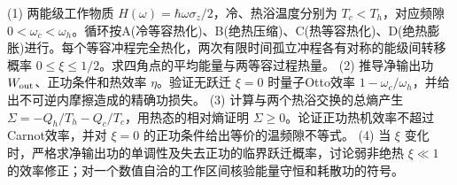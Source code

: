 (1) 两能级工作物质 \(H(\omega)=\hbar\omega\sigma_z/2\)，冷、热浴温度分别为 \(T_c<T_h\)，对应频隙 \(0<\omega_c<\omega_h\)。循环按A(冷等容热化)、B(绝热压缩)、C(热等容热化)、D(绝热膨胀)进行。每个等容冲程完全热化，两次有限时间孤立冲程各有对称的能级间转移概率 \(0\le\xi\le1/2\)。求四角点的平均能量与两等容过程热量。
(2) 推导净输出功 \(W_{\rm out}\)、正功条件和热效率 \(\eta\)。验证无跃迁 \(\xi=0\) 时量子Otto效率 \(1-\omega_c/\omega_h\)，并给出不可逆内摩擦造成的精确功损失。
(3) 计算与两个热浴交换的总熵产生 \(\Sigma=-Q_h/T_h-Q_c/T_c\)，用热态的相对熵证明 \(\Sigma\ge0\)。论证正功热机效率不超过Carnot效率，并对 \(\xi=0\) 的正功条件给出等价的温频隙不等式。
(4) 当 \(\xi\) 变化时，严格求净输出功的单调性及失去正功的临界跃迁概率，讨论弱非绝热 \(\xi\ll1\) 的效率修正；对一个数值自洽的工作区间核验能量守恒和耗散功的符号。
